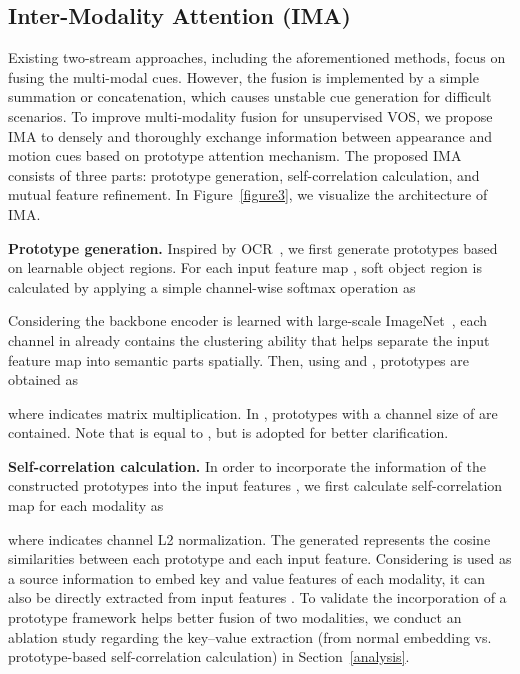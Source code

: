 \documentclass[10pt,twocolumn,letterpaper]{article}
\begin{document}
\subsection{Inter-Modality Attention (IMA)}
\label{IMA}
Existing two-stream approaches, including the aforementioned methods, focus on fusing the multi-modal cues. However, the fusion is implemented by a simple summation or concatenation, which causes unstable cue generation for difficult scenarios. To improve multi-modality fusion for unsupervised VOS, we propose IMA to densely and thoroughly exchange information between appearance and motion cues based on prototype attention mechanism. The proposed IMA consists of three parts: prototype generation, self-correlation calculation, and mutual feature refinement. In Figure~\ref{figure3}, we visualize the architecture of IMA.


\vspace{1mm}
\noindent\textbf{Prototype generation.} Inspired by OCR~\cite{OCR}, we first generate prototypes based on learnable object regions. For each input feature map , soft object region  is calculated by applying a simple channel-wise softmax operation as

Considering the backbone encoder is learned with large-scale ImageNet~\cite{imagenet}, each channel in  already contains the clustering ability that helps separate the input feature map into semantic parts spatially. Then, using  and , prototypes  are obtained as

where  indicates matrix multiplication. In ,  prototypes with a channel size of  are contained. Note that  is equal to , but is adopted for better clarification. 



\vspace{1mm}
\noindent\textbf{Self-correlation calculation.} In order to incorporate the information of the constructed prototypes  into the input features , we first calculate self-correlation map  for each modality as

where  indicates channel L2 normalization. The generated  represents the cosine similarities between each prototype and each input feature. Considering  is used as a source information to embed key and value features of each modality, it can also be directly extracted from input features . To validate the incorporation of a prototype framework helps better fusion of two modalities, we conduct an ablation study regarding the  key--value extraction (from normal embedding vs. prototype-based self-correlation calculation) in Section~\ref{analysis}.
\end{document}
